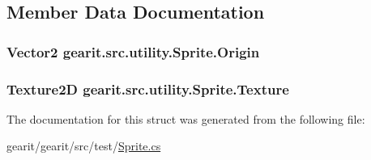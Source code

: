 \subsection{Member Data Documentation}
\hypertarget{structgearit_1_1src_1_1utility_1_1_sprite_ad713d03a171895b37dae49e94bc22dc1}{
\subsubsection[{Origin}]{\setlength{\rightskip}{0pt plus 5cm}Vector2 gearit.\+src.\+utility.\+Sprite.\+Origin}}\label{structgearit_1_1src_1_1utility_1_1_sprite_ad713d03a171895b37dae49e94bc22dc1}
\hypertarget{structgearit_1_1src_1_1utility_1_1_sprite_a56eddd9af1685b731d691584618963b3}{
\subsubsection[{Texture}]{\setlength{\rightskip}{0pt plus 5cm}Texture2\+D gearit.\+src.\+utility.\+Sprite.\+Texture}}\label{structgearit_1_1src_1_1utility_1_1_sprite_a56eddd9af1685b731d691584618963b3}


The documentation for this struct was generated from the following file\+:\begin{DoxyCompactItemize}
\item 
gearit/gearit/src/test/\hyperlink{test_2_sprite_8cs}{Sprite.\+cs}\end{DoxyCompactItemize}
